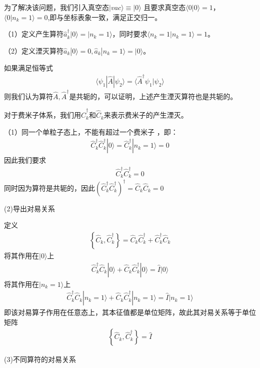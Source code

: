 \documentclass[12pt, a4paper, oneside, UTF8]{ctexbook}
\begin{document}
为了解决该问题，我们引入真空态$|vac\rangle\equiv|0\rangle$
且要求真空态$\langle 0|0\rangle=1$，$\langle 0|n_k=1\rangle=0$,即与坐标表象一致，满足正交归一。

（1）定义产生算符$\hat{a}_k^{\dag}|0\rangle=|n_k=1\rangle$，同时要求$\langle n_k=1|n_k=1\rangle=1$。

（2）定义湮灭算符$\hat{a}_k|0\rangle=0 , \hat{a}_k|n_k=1\rangle=|0\rangle$。

如果满足恒等式
\begin{eqnarray}
    \langle\psi_1|\hat{A}|\psi_2\rangle=\langle\hat{A}^{\dag}\psi_1|\psi_2\rangle
\end{eqnarray}
则我们认为算符$\hat{A},\hat{A}^{\dag}$是共轭的，可以证明，上述产生湮灭算符也是共轭的。

对于费米子体系，我们用$\hat{C}^{\dag}_k$和$\hat{C}_k$来表示费米子的产生湮灭。

（1）同一个单粒子态上，不能有超过一个费米子
，即：
\begin{eqnarray}
    \hat{C}^{\dag}_k\hat{C}^{\dag}_k|0\rangle=\hat{C}^{\dag}_k|n_k=1\rangle=0
\end{eqnarray}
因此我们要求
\begin{eqnarray}
    \hat{C}^{\dag}_k\hat{C}^{\dag}_k=0
\end{eqnarray}
同时因为算符是共轭的，因此$(\hat{C}^{\dag}_k\hat{C}^{\dag}_k)^\dag =\hat{C}_k\hat{C}_k=0$

(2)导出对易关系

定义
\begin{eqnarray}
    \left\{\hat{C}_k,\hat{C}_k^\dag \right\}=\hat{C}_k\hat{C}_k^\dag+\hat{C}_k^\dag\hat{C}_k
\end{eqnarray}
将其作用在$|0\rangle$上
\begin{eqnarray}
    \hat{C}_k^\dag\hat{C}_k|0\rangle+\hat{C}_k\hat{C}_k^\dag |0\rangle=\hat{I}|0\rangle
\end{eqnarray}
将其作用在$|n_k=1\rangle$上
\begin{eqnarray}
    \hat{C}_k^\dag\hat{C}_k|n_k=1\rangle+\hat{C}_k\hat{C}_k^\dag |n_k=1\rangle=\hat{I}|n_k=1\rangle
\end{eqnarray}
即该对易算子作用在任意态上，其本征值都是单位矩阵，故此其对易关系等于单位矩阵
\begin{eqnarray}
    \left\{\hat{C}_k,\hat{C}_k^\dag \right\}=\hat{I}
\end{eqnarray}

(3)不同算符的对易关系
\end{document}
